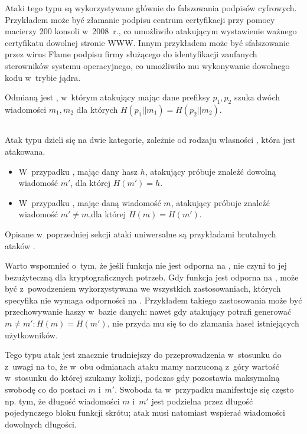 Ataki tego typu są wykorzystywane głównie do fałszowania podpisów cyfrowych.
Przykładem może być złamanie podpisu centrum certyfikacji przy pomocy macierzy
200 konsoli  w~2008~r.\cite{ps3_attack}, co umożliwiło
atakującym wystawienie ważnego certyfikatu dowolnej stronie WWW. Innym
przykładem może być sfałszowanie przez wirus Flame podpisu firmy
 służącego do identyfikacji zaufanych sterowników systemu
operacyjnego\cite{flame_attack}, co umożliwiło mu wykonywanie dowolnego kodu
w~trybie jądra.

Odmianą  jest ,
w~którym atakujący mając dane prefiksy $p_1, p_2$ szuka dwóch wiadomości $m_1,
m_2$ dla których $H(p_1 || m_1) = H(p_2 || m_2)$.


\subsection{}
Atak typu  dzieli się na dwie kategorie, zależnie od rodzaju
własności , która jest atakowana.
    \begin{itemize}

    \item W~przypadku , mając dany hasz $h$, atakujący
    próbuje znaleźć dowolną wiadomość $m'$, dla której $H(m') = h$.

    \item W~przypadku , mając daną wiadomość $m$,
    atakujący próbuje znaleźć wiadomość $m' \neq m$,dla której $H(m) = H(m')$.

    \end{itemize}
Opisane w~poprzedniej sekcji ataki uniwersalne są przykładami
brutalnych ataków .

Warto wspomnieć o~tym, że jeśli funkcja nie jest odporna na , nie czyni to jej bezużyteczną dla kryptograficznych potrzeb. Gdy
funkcja jest odporna na , może być z~powodzeniem
wykorzystywana we wszystkich zastosowaniach, których specyfika nie wymaga
odporności na . Przykładem takiego zastosowania może być
przechowywanie haszy w~bazie danych: nawet gdy atakujący potrafi generować $m
\neq m' : H(m) = H(m')$, nie przyda mu się to do złamania haseł istniejących
użytkowników.

Tego typu atak jest znacznie trudniejszy do przeprowadzenia w~stosunku do
 z~uwagi na to, że w~obu odmianach ataku mamy narzuconą
z~góry wartość w~stosunku do której szukamy kolizji, podczas gdy  pozostawia maksymalną swobodę co do postaci $m$ i~$m'$. Swoboda ta
w~przypadku  manifestuje się często np. tym, że długość
wiadomości $m$ i~$m'$ jest podzielna przez długość pojedynczego bloku funkcji
skrótu; atak  musi natomiast wspierać wiadomości dowolnych
długości.

